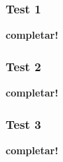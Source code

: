 \subsubsection{Test 1}

\vspace*{0.3cm}

\textbf{completar!}


\newpage
\subsubsection{Test 2}

\vspace*{0.3cm}

\textbf{completar!}


\newpage
\subsubsection{Test 3}

\vspace*{0.3cm}

\textbf{completar!}
